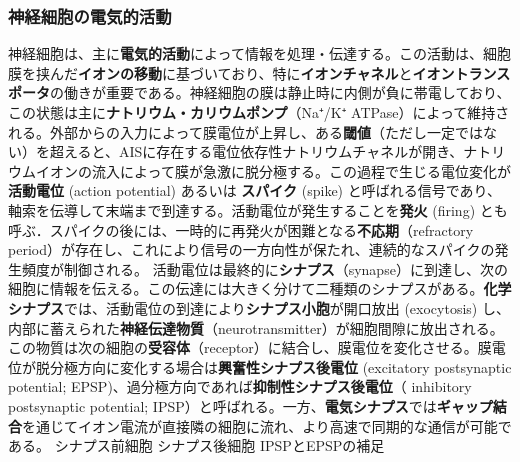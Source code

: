 \subsubsection{神経細胞の電気的活動}
神経細胞は、主に\textbf{電気的活動}によって情報を処理・伝達する。この活動は、細胞膜を挟んだ\textbf{イオンの移動}に基づいており、特に\textbf{イオンチャネル}と\textbf{イオントランスポータ}の働きが重要である。神経細胞の膜は静止時に内側が負に帯電しており、この状態は主に\textbf{ナトリウム・カリウムポンプ}（Na⁺/K⁺ ATPase）によって維持される。外部からの入力によって膜電位が上昇し、ある\textbf{閾値}（ただし一定ではない）を超えると、AISに存在する電位依存性ナトリウムチャネルが開き、ナトリウムイオンの流入によって膜が急激に脱分極する。この過程で生じる電位変化が\textbf{活動電位} (action potential) あるいは \textbf{スパイク} (spike) と呼ばれる信号であり、軸索を伝導して末端まで到達する。活動電位が発生することを\textbf{発火} (firing) とも呼ぶ．スパイクの後には、一時的に再発火が困難となる\textbf{不応期}（refractory period）が存在し、これにより信号の一方向性が保たれ、連続的なスパイクの発生頻度が制御される。
活動電位は最終的に\textbf{シナプス}（synapse）に到達し、次の細胞に情報を伝える。この伝達には大きく分けて二種類のシナプスがある。\textbf{化学シナプス}では、活動電位の到達により\textbf{シナプス小胞}が開口放出 (exocytosis) し、内部に蓄えられた\textbf{神経伝達物質}（neurotransmitter）が細胞間隙に放出される。この物質は次の細胞の\textbf{受容体}（receptor）に結合し、膜電位を変化させる。膜電位が脱分極方向に変化する場合は\textbf{興奮性シナプス後電位} (excitatory postsynaptic potential; EPSP)、過分極方向であれば\textbf{抑制性シナプス後電位}（ inhibitory postsynaptic potential; IPSP）と呼ばれる。一方、\textbf{電気シナプス}では\textbf{ギャップ結合}を通じてイオン電流が直接隣の細胞に流れ、より高速で同期的な通信が可能である。
シナプス前細胞
シナプス後細胞
IPSPとEPSPの補足
